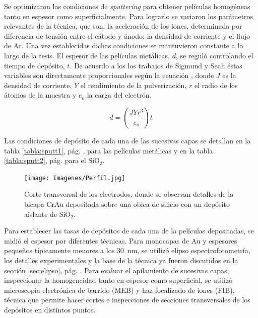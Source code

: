 		 Se optimizaron las condiciones de \textit{sputtering} para obtener películas homogéneas tanto en espesor como superficialmente. Para lograrlo se variaron los parámetros relevantes de la técnica, que son: la aceleración de los iones, determinada por diferencia de tensión entre el cátodo y ánodo; la densidad de corriente y el flujo de Ar. Una vez establecidas dichas condiciones se mantuvieron constante a lo largo de la tesis. El espesor de las películas metálicas, $d$, se reguló controlando el tiempo de depósito, $t$. De acuerdo a los los trabajos de Sigmund\cite{sigmund1968} y Seah\cite{Seah2005} éstas variables son directamente proporcionales según la ecuación \label{eq:sputt}, donde $J$ es la densidad de corriente, $Y$ el rendimiento de la pulverización, $r$ el radio de los átomos de la muestra y $e_o$ la carga del electrón.

	 			\begin{equation}
	 				d=\left(\frac{JYr^3}{e_o}\right)t
	 				\label{eq:sputt}
	 			\end{equation}

		 Las condiciones de depósito de cada una de las sucesivas capas se detallan en la tabla \ref{tabla:sputt1}, pág. \pageref{tabla:sputt1}, para las películas metálicas y en la tabla  \ref{tabla:sputt2}, pág. \pageref{tabla:sputt2} para el SiO$_2$. 

						  \begin{figure}[ht!]
						  \begin{center}
						  \texttt{[image: Imagenes/Perfil.jpg]}
						  \caption[Sección trasversal de los eletrodos]{Corte transversal de los electrodos, donde se observan detalles de la bicapa Cr\textbar Au depositada sobre una oblea de silicio con un depósito aislante de SiO$_2$.}
						  \label{fig:FIB_electrodos}
						  \end{center}
						  \end{figure} 	

		 Para establecer las tasas de depósitos de cada una de la películas depositadas, se midió el espesor por diferentes técnicas. Para monocapas de Au y espesores pequeños típicamente menores a los \SI{30}{\nm}, se utilizó elipso espectrofotometría, los detalles experimentales y la base de la técnica ya fueron discutidos en la sección \ref{sec:elipso}, pág. \pageref{sec:elipso}. Para evaluar el apilamiento de sucesivas capas, inspeccionar la homogeneidad tanto en espesor como superficial, se utilizó microscopia electrónica de barrido (MEB) y haz focalizado de iones (FIB), técnica que permite hacer cortes e inspecciones de secciones transversales de los depósitos en distintos puntos. 

